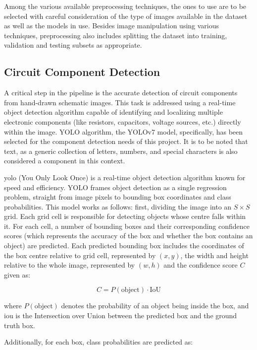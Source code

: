 Among the various available preprocessing techniques, the ones to use are to be selected with careful consideration of the type of images available in the dataset as well as the models in use. Besides image manipulation using various techniques, preprocessing also includes splitting the dataset into training, validation and testing subsets as appropriate.

\subsection{Circuit Component Detection}

A critical step in the pipeline is the accurate detection of circuit components from hand-drawn schematic images. This task is addressed using a real-time object detection algorithm capable of identifying and localizing multiple electronic components (like resistors, capacitors, voltage sources, etc.) directly within the image. YOLO algorithm, the YOLOv7 model, specifically, has been selected for the component detection needs of this project. It is to be noted that text, as a generic collection of letters, numbers, and special characters is also considered a component in this context.

\gls{yolo} (You Only Look Once) is a real-time object detection algorithm known for speed and efficiency. YOLO frames object detection as a single regression problem, straight from image pixels to bounding box coordinates and class probabilities. This model works as follows: first, dividing the image into an $S \times S$ grid. Each grid cell is responsible for detecting objects whose centre falls within it. For each cell, a number of bounding boxes and their corresponding confidence scores (which represents the accuracy of the box and whether the box contains an object) are predicted. Each predicted bounding box includes the coordinates of the box centre relative to grid cell, represented by $(x,y)$, the width and height relative to the whole image, represented by $(w,h)$ and the confidence score $C$ given as:

\begin{equation}
C = P(\text{object}) \cdot \text{IoU}
\label{eq:yolo-confidence-score}
\end{equation}

where $P(\text{object})$ denotes the probability of an object being inside the box, and \gls{iou} is the Intersection over Union between the predicted box and the ground truth box.

Additionally, for each box, class probabilities are predicted as:

